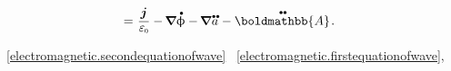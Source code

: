 \begin{multline}
= \hspace{.1ex} \displaystyle \frac{\currentdensity}{\raisemath{.16em}{\vacuumpermittivity}} - \hspace{-0.15ex} \boldnabla \mathdotabove{\upphi} - \hspace{-0.15ex} \boldnabla \hspace{.1ex} \mathdotdotabove{a} \hspace{.1ex} - \mathdotdotabove{\boldmathbb{A}}
\hspace{.2ex} .
\end{multline}

~\eqref{electromagnetic.secondequationofwave}
~\eqref{electromagnetic.firstequationofwave},

